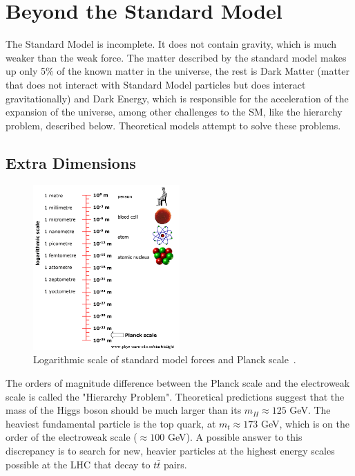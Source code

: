 \section{Beyond the Standard Model}


The Standard Model is incomplete. It does not contain gravity, which is much weaker than the weak force. The matter described by the standard model makes up only 5\% of the known matter in the universe, the rest is Dark Matter (matter that does not interact with Standard Model particles but does interact gravitationally) and Dark Energy, which is responsible for the acceleration of the expansion of the universe, among other challenges to the SM, like the hierarchy problem, described below. Theoretical models attempt to solve these problems. 


\subsection*{Extra Dimensions}


\begin{figure}[h!]
	\centering
	\includegraphics[width=0.5\textwidth]{figures/Planck_scale.png}
	\caption{Logarithmic scale of standard model forces and Planck scale~\cite{Planck_scale}.}
	\label{fig:planck}
\end{figure}


The orders of magnitude difference between the Planck scale and the electroweak scale is called the "Hierarchy Problem". Theoretical predictions suggest that the mass of the Higgs boson should be much larger than its $m_H \approx 125$ GeV. The heaviest fundamental particle is the top quark, at $m_t \approx 173$ GeV, which is on the order of the electroweak scale ($\approx 100$ GeV). A possible answer to this discrepancy is to search for new, heavier particles at the highest energy scales possible at the LHC that decay to $t\bar{t}$ pairs. 

